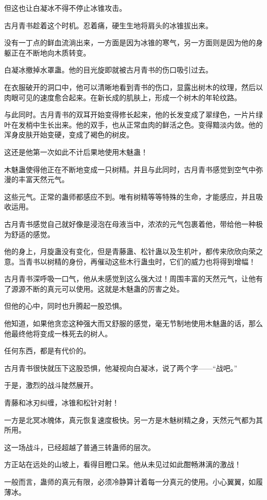 \begin{this_body}
但这也让白凝冰不得不停止冰锥攻击。

古月青书趁着这个时机。忍着痛，硬生生地将肩头的冰锥拔出来。

没有一丁点的鲜血流淌出来，一方面是因为冰锥的寒气，另一方面则是因为他的身躯正在不断地向木质转变。

白凝冰撤掉水罩蛊。他的目光旋即就被古月青书的伤口吸引过去。

在衣服破开的洞口中，他可以清晰地看到青书的伤口，显露出树木的纹理，然后以肉眼可见的速度愈合起来。在新长成的肌肤上，形成一个树木的年轮纹路。

与此同时。古月青书的双耳开始变得修长起来，他的长发变成了翠绿色，一片片绿叶在发梢中生长出来。他的双手，也从正常血肉的鲜活之色。变得黯淡内敛。他的浑身皮肤开始变硬，变成了褐色的树皮。

这还是他第一次如此不计后果地使用木魅蛊！

木魅蛊使得他正在不断地变成一只树精。并且与此同时，古月青书感觉到空气中弥漫的丰富天然元气。

这些元气。正常的蛊师都感应不到。唯有树精等等特殊的生命，才能感应，并且吸收运用。

古月青书感觉自己就好像是浸泡在母液当中，浓浓的元气包裹着他，带给他一种极为舒适的感觉。

他的身上，月旋蛊没有变化，但是青藤蛊、松针蛊以及生机叶，都传来欣欣向荣之意。当青书以树精的身份，再催动这些木行蛊虫时，它们的威力也将得到增幅！

古月青书深呼吸一口气，他从未感觉到这么强大过！周围丰富的天然元气，让他有了源源不断的真元可以使用。这就是木魅蛊的厉害之处。

但他的心中，同时也升腾起一股恐惧。

他知道，如果他贪恋这种强大而又舒服的感觉，毫无节制地使用木魅蛊的话，那么他最终他将变成一株死去的树人。

任何东西，都是有代价的。

古月青书很快就压下这股恐惧，他凝视向白凝冰，说了两个字——“战吧。”

于是，激烈的战斗陡然展开。

青藤和冰刃纠缠，冰锥和松针对射！

一方是北冥冰魄体，真元恢复速度极快。另一方是木魅树精之身，天然元气都为其所用。

这一场战斗，已经超越了普通三转蛊师的层次。

方正站在远处的山坡上，看得目瞪口呆。他从未见过如此酣畅淋漓的激战！

一般而言，蛊师的真元有限，必须冷静算计着每一分真元的使用。小心翼翼，如履薄冰。


\end{this_body}
